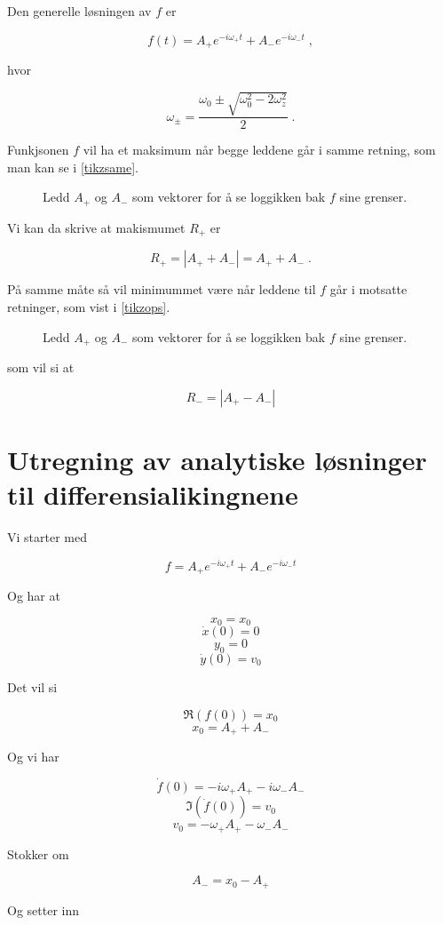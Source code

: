 \documentclass[reprint,english,notitlepage, nofootinbib]{revtex4-1}  %
\begin{document}
Den generelle løsningen av $f$ er

$$f(t) =A_+e^{-i\omega_+ t} + A_-e^{-i\omega_- t} \; ,$$

hvor

$$\omega_{\pm} = \frac{\omega_0 \pm \sqrt{\omega_0^2 - 2\omega_z^2}}{2} \; .$$

Funkjsonen $f$ vil ha et maksimum når begge leddene går i samme retning, som man kan se i \autoref{tikzsame}. 

\begin{figure}
\scalebox{0.7}{}
\caption{Ledd $A_+$ og $A_-$ som vektorer for å se loggikken bak $f$ sine grenser.}
\label{tikzsame}
\end{figure}

Vi kan da skrive at makismumet $R_+$ er

$$R_+ = |A_+ + A_-| = A_+ + A_- \; .$$

På samme måte så vil minimummet være når leddene til $f$ går i motsatte retninger, som vist i \autoref{tikzops}. 

\begin{figure}
\centering
\scalebox{0.7}{}
\caption{Ledd $A_+$ og $A_-$ som vektorer for å se loggikken bak $f$ sine grenser.}
\label{tikzops}
\end{figure}

som vil si at

$$R_- = |A_+ - A_-|$$

\section{Utregning av analytiske løsninger til differensialikingnene}\label{DiffA}

Vi starter med

$$f = A_+e^{-i\omega_+t} + A_-e^{-i\omega_-t}$$

Og har at

$$x_0 = x_0$$
$$\dot{x}(0) = 0$$
$$y_0 = 0$$
$$\dot{y}(0) = v_0$$

Det vil si

$$\Re(f(0)) = x_0$$
$$x_0 = A_+ + A_-$$

Og vi har

$$\dot{f}(0) = -i\omega_+A_+ - i\omega_-A_-$$
$$\Im(\dot{f}(0)) = v_0$$
$$v_0 = -\omega_+A_+ - \omega_-A_-$$

Stokker om

$$A_- = x_0 - A_+$$

Og setter inn
\end{document}
